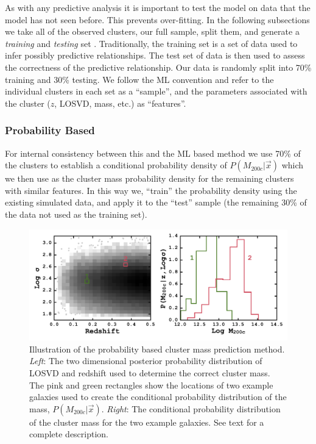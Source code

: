 As with any predictive analysis it is important to test the model on data that the model has not seen before. This prevents over-fitting. In the following subsections we take all of the observed clusters, our full sample, split them, and generate a \emph{training} and \emph{testing} set . Traditionally, the training set is a set of data used to infer possibly predictive relationships. The test set of data is then used to assess the correctness of the predictive relationship. Our data is randomly split into 70\% training and 30\% testing. We follow the ML convention and refer to the individual clusters in each set as a ``sample'', and the parameters associated with the cluster ($z$, LOSVD, mass, etc.) as ``features''.

\subsubsection{Probability Based}\label{sec:probability method}
For internal consistency between this and the ML based method we use 70\% of the clusters to establish a conditional probability density of $P(M_{200c} | \vec{x})$ which we then use as the cluster mass probability density for the remaining clusters with similar features. In this way we, ``train'' the probability density using the existing simulated data, and apply it to the ``test'' sample (the remaining 30\% of the data not used as the training set).

\begin{figure}[t]
	\begin{centering}
		\includegraphics[width=\textwidth]{figures1/prob_example.pdf} 
	\end{centering}
	\caption[Illustration of the probability based cluster mass prediction method.]{Illustration of the probability based cluster mass prediction method. \emph{Left}: The two dimensional posterior probability distribution of LOSVD and redshift used to determine the correct cluster mass. The pink and green rectangles show the locations of two example galaxies used to create the conditional probability distribution of the mass, $P(M_{200c}|\vec{x})$. \emph{Right}: The conditional probability distribution of the cluster mass for the two example galaxies. See text for a complete description.}
	\label{fig: probability corner} 
\end{figure}

